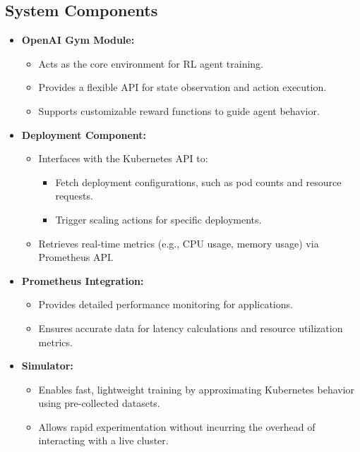 \documentclass[conference]{IEEEtran}
\begin{document}
\subsection{System Components}
\begin{itemize}
    \item \textbf{OpenAI Gym Module:}
    \begin{itemize}
        \item Acts as the core environment for RL agent training.
        \item Provides a flexible API for state observation and action execution.
        \item Supports customizable reward functions to guide agent behavior.
    \end{itemize}
    \item \textbf{Deployment Component:}
    \begin{itemize}
        \item Interfaces with the Kubernetes API to:
        \begin{itemize}
            \item Fetch deployment configurations, such as pod counts and resource requests.
            \item Trigger scaling actions for specific deployments.
        \end{itemize}
        \item Retrieves real-time metrics (e.g., CPU usage, memory usage) via Prometheus API.
    \end{itemize}
    \item \textbf{Prometheus Integration:}
    \begin{itemize}
        \item Provides detailed performance monitoring for applications.
        \item Ensures accurate data for latency calculations and resource utilization metrics.
    \end{itemize}
    \item \textbf{Simulator:}
    \begin{itemize}
        \item Enables fast, lightweight training by approximating Kubernetes behavior using pre-collected datasets.
        \item Allows rapid experimentation without incurring the overhead of interacting with a live cluster.
    \end{itemize}
\end{itemize}
\end{document}
